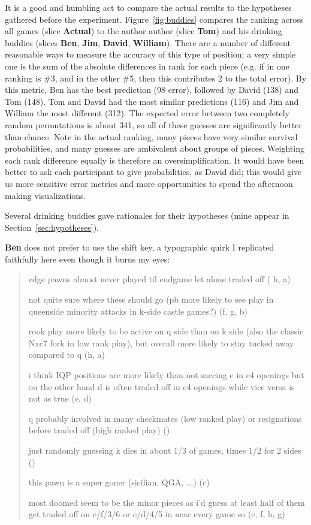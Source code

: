 \documentclass[twocolumn]{article}
\begin{document}
It is a good and humbling act to compare the actual results to the
hypotheses gathered before the experiment. Figure~\ref{fig:buddies}
compares the ranking across all games (slice {\bf Actual}) to the
author author (slice {\bf Tom}) and his drinking buddies (slices {\bf
  Ben}, {\bf Jim}, {\bf David}, {\bf William}). There are a number of
different reasonable ways to measure the accuracy of this type of
position; a very simple one is the sum of the absolute differences in
rank for each piece (e.g. if in one ranking \king is \#3, and in the
other \#5, then this contributes 2 to the total error). By this
metric, Ben has the best prediction (98 error), followed by David
(138) and Tom (148). Tom and David had the most similar predictions
(116) and Jim and William the most different (312). The expected error
between two completely random permutations is about 341, so all of
these guesses are significantly better than chance. Note in the actual
ranking, many pieces have very similar survival probabilities, and
many guesses are ambivalent about groups of pieces. Weighting each
rank difference equally is therefore an oversimplification. It would
have been better to ask each participant to give probabilities, as
David did; this would give us more sensitive error metrics and more
opportunities to spend the afternoon making visualizations.

Several drinking buddies gave rationales for their hypotheses (mine
appear in Section~\ref{sec:hypotheses}).

\medskip
{\bf Ben} does not prefer to use the shift key, a typographic quirk I
replicated faithfully here even though it burns my eyes:

\begin{quote}
edge pawns almost never played til endgame let alone traded off (\pawn
h, \pawn a)

not quite sure where these should go (pb more likely to see play in
queenside minority attacks in k-side castle games?) (\pawn f, \pawn g, \pawn b)

rook play more likely to be active on q side than on k side (also the
classic Nxc7 fork in low rank play), but overall more likely to stay
tucked away compared to q (\rook h, \rook a)

i think IQP positions are more likely than not saccing e in e4 openings
but on the other hand d is often traded off in e4 openings while vice
versa is not as true (\pawn e, \pawn d)

q probably involved in many checkmates (low ranked play) or resignations
before traded off (high ranked play) (\queen)

just randomly guessing k dies in about 1/3 of games, times 1/2 for 2
sides (\king)

this pawn is a super goner (sicilian, QGA, ...) (\pawn c)

most doomed seem to be the minor pieces as i'd guess at least half of
them get traded off on c/f/3/6 or e/d/4/5 in near every game so (\bishop c, \bishop f, \knight b, \knight g)
\end{quote}
\end{document}
